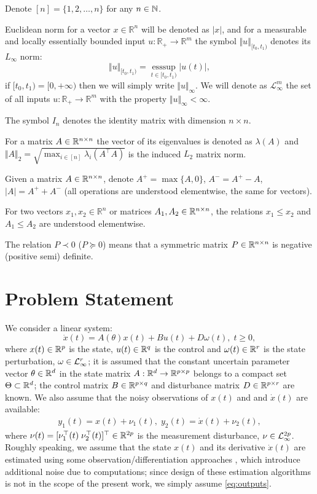 \documentclass[letterpaper, 10 pt, conference]{ieeeconf}  %
\begin{document}
Denote $[n]=\{1,2,\dots,n\}$ for any $n\in\mathbb{N}$.

Euclidean norm for a vector $x\in\mathbb{R}^{n}$ will be denoted
as $|x|$, and for a measurable and locally essentially bounded input
$u:\mathbb{R}_{+}\to\mathbb{R}^{m}$ the symbol $\Vert u\Vert_{[t_{0},t_{1})}$
denotes its $L_{\infty}$ norm:
\[
\Vert u\Vert_{[t_{0},t_{1})}=\underset{t\in[t_{0},t_{1})}{\text{ess}\sup}|u(t)|,
\]
if $[t_{0},t_{1})=[0,+\infty)$ then we will simply write $\Vert u\Vert_{\infty}$.
We will denote as $\mathcal{L}_{\infty}^{m}$ the set of all inputs
$u:\mathbb{R}_{+}\to\mathbb{R}^{m}$ with the property $\Vert u\Vert_{\infty}<\infty$.

The symbol $I_{n}$ denotes the identity matrix with dimension $n\times n$.

For a matrix $A\in\mathbb{R}^{n\times n}$ the vector of its eigenvalues
is denoted as $\lambda(A)$ and $\Vert A\Vert_{2}=\sqrt{\max_{i\in[n]}\lambda_{i}(A^{\top}A)}$
is the induced $L_{2}$ matrix norm.

Given a matrix $A\in\mathbb{R}^{n\times n}$, denote $A^{+}=\max\{A,0\}$,
$A^{-}=A^{+}-A$, $|A|=A^{+}+A^{-}$ (all operations are understood
elementwise, the same for vectors). 

For two vectors $x_{1},x_{2}\in\mathbb{R}^{n}$ or matrices $A_{1},A_{2}\in\mathbb{R}^{n\times n}$,
the relations $x_{1}\le x_{2}$ and $A_{1}\le A_{2}$ are understood
elementwise. 

The relation $P\prec0$ ($P\succeq0$) means that a symmetric matrix
$P\in\mathbb{R}^{n\times n}$ is negative (positive semi) definite.

\section{\label{sec:Problem} Problem Statement}

We consider a linear system: 
\begin{equation}
\dot{x}(t)=A(\theta)x(t)+Bu(t)+D\omega(t),\;t\geq0,\label{eq:dynamics}
\end{equation}
where $x(t)\in\mathbb{R}^{p}$ is the state, $u(t)\in\mathbb{R}^{q}$ is the
control and $\omega(t)\in\mathbb{R}^{r}$ is the state perturbation, $\omega\in\mathcal{L}_{\infty}^{r}$;
it is assumed that the constant uncertain parameter vector $\theta\in\mathbb{R}^{d}$
in the state matrix $A:\mathbb{R}^{d}\to\mathbb{R}^{p\times p}$ belongs to
a compact set $\Theta\subset\mathbb{R}^{d}$; the control matrix $B\in\mathbb{R}^{p\times q}$
and disturbance matrix $D\in\mathbb{R}^{p\times r}$ are known. We also
assume that the noisy observations of $x(t)$ and and $\dot{x}(t)$
are available:
\begin{gather}
y_{1}(t)=x(t)+\nu_{1}(t),\;y_{2}(t)=\dot{x}(t)+\nu_{2}(t),\label{eq:outputs}
\end{gather}
where $\nu(t)=[\nu_{1}^{\top}(t)\;\nu_{2}^{\top}(t)]^{\top}\in\mathbb{R}^{2p}$
is the measurement disturbance, $\nu\in\mathcal{L}_{\infty}^{2p}$. Roughly
speaking, we assume that the state $x(t)$ and its derivative $\dot{x}(t)$
are estimated using some observation/differentiation approaches \cite{Besancon2007,Reichhartinger2018},
which introduce additional noise due to computations; since design
of these estimation algorithms is not in the scope of the present
work, we simply assume \eqref{eq:outputs}. 
\end{document}
